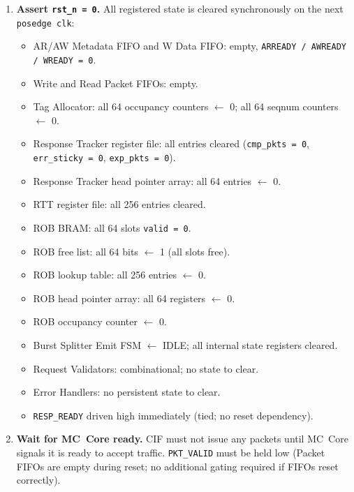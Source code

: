 \begin{enumerate}
  \item \textbf{Assert \texttt{rst\_n = 0}.}
        All registered state is cleared synchronously on the next
        \texttt{posedge clk}:
        \begin{itemize}
          \item AR/AW Metadata FIFO and W Data FIFO: empty, \texttt{ARREADY / AWREADY / WREADY = 0}.
          \item Write and Read Packet FIFOs: empty.
          \item Tag Allocator: all 64 occupancy counters $\leftarrow$ 0; all 64 seqnum counters $\leftarrow$ 0.
          \item Response Tracker register file: all entries cleared (\texttt{cmp\_pkts = 0}, \texttt{err\_sticky = 0}, \texttt{exp\_pkts = 0}).
          \item Response Tracker head pointer array: all 64 entries $\leftarrow$ 0.
          \item RTT register file: all 256 entries cleared.
          \item ROB BRAM: all 64 slots \texttt{valid = 0}.
          \item ROB free list: all 64 bits $\leftarrow$ 1 (all slots free).
          \item ROB lookup table: all 256 entries $\leftarrow$ 0.
          \item ROB head pointer array: all 64 registers $\leftarrow$ 0.
          \item ROB occupancy counter $\leftarrow$ 0.
          \item Burst Splitter Emit FSM $\leftarrow$ \textsc{IDLE}; all internal state registers cleared.
          \item Request Validators: combinational; no state to clear.
          \item Error Handlers: no persistent state to clear.
          \item \texttt{RESP\_READY} driven high immediately (tied; no reset dependency).
        \end{itemize}

  \item \textbf{Wait for MC~Core ready.}
        CIF must not issue any packets until MC~Core signals it is ready to
        accept traffic. \texttt{PKT\_VALID} must be held low (Packet FIFOs are
        empty during reset; no additional gating required if FIFOs reset
        correctly).


\end{enumerate}
